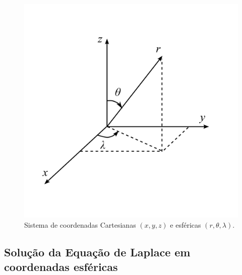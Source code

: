 \documentclass[10pt,a4paper,fleqn]{article}
\begin{document}
\begin{figure}[h]
    \centering
    \includegraphics[scale=1]{Fig2.png}
    \caption{Sistema de coordenadas Cartesianas $(x,y,z)$ e esf\'{e}ricas $(r,\theta,\lambda)$.}
    \label{fig:fig2}
\end{figure}

\subsection{Solu\c{c}\~{a}o da Equa\c{c}\~{a}o de Laplace em coordenadas esf\'{e}ricas}
\end{document}
